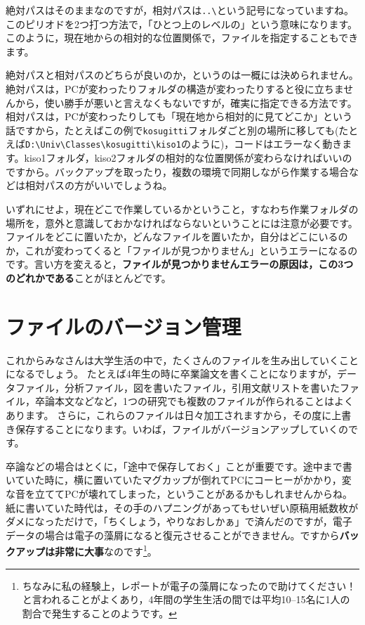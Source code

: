 \documentclass{ltjsbook}
\begin{document}
絶対パスはそのままなのですが，相対パスは\verb|..\|という記号になっていますね。このピリオドを2つ打つ方法で，「ひとつ上のレベルの」という意味になります。このように，現在地からの相対的な位置関係で，ファイルを指定することもできます。

絶対パスと相対パスのどちらが良いのか，というのは一概には決められません。
絶対パスは，PCが変わったりフォルダの構造が変わったりすると役に立ちませんから，使い勝手が悪いと言えなくもないですが，確実に指定できる方法です。
相対パスは，PCが変わったりしても「現在地から相対的に見てどこか」という話ですから，たとえばこの例で\verb|kosugitti|フォルダごと別の場所に移しても(たとえば\verb|D:\Univ\Classes\kosugitti\kiso1|のように)，コードはエラーなく動きます。kiso1フォルダ，kiso2フォルダの相対的な位置関係が変わらなければいいのですから。バックアップを取ったり，複数の環境で同期しながら作業する場合などは相対パスの方がいいでしょうね。

いずれにせよ，現在どこで作業しているかということ，すなわち作業フォルダの場所を，意外と意識しておかなければならないということには注意が必要です。ファイルをどこに置いたか，どんなファイルを置いたか，自分はどこにいるのか，これが変わってくると「ファイルが見つかりません」というエラーになるのです。言い方を変えると，\textbf{ファイルが見つかりませんエラーの原因は，この3つのどれかである}ことがほとんどです。

\section{ファイルのバージョン管理}
\label{versionControl}
これからみなさんは大学生活の中で，たくさんのファイルを生み出していくことになるでしょう。
たとえば4年生の時に卒業論文を書くことになりますが，データファイル，分析ファイル，図を書いたファイル，引用文献リストを書いたファイル，卒論本文などなど，1つの研究でも複数のファイルが作られることはよくあります。
さらに，これらのファイルは日々加工されますから，その度に上書き保存することになります。いわば，ファイルがバージョンアップしていくのです。

卒論などの場合はとくに，「途中で保存しておく」ことが重要です。途中まで書いていた時に，横に置いていたマグカップが倒れてPCにコーヒーがかかり，変な音を立ててPCが壊れてしまった，ということがあるかもしれませんからね。紙に書いていた時代は，その手のハプニングがあってもせいぜい原稿用紙数枚がダメになっただけで，「ちくしょう，やりなおしかぁ」で済んだのですが，電子データの場合は電子の藻屑になると復元させることができません。ですから\textbf{バックアップは非常に大事}なのです\footnote{ちなみに私の経験上，レポートが電子の藻屑になったので助けてください！と言われることがよくあり，4年間の学生生活の間では平均10--15名に1人の割合で発生することのようです。}。
\end{document}
